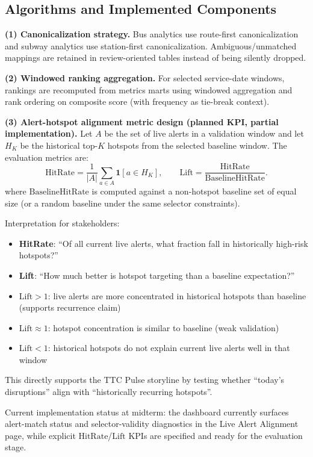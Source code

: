 \subsection{Algorithms and Implemented Components}
\textbf{(1) Canonicalization strategy.}
Bus analytics use route-first canonicalization and subway analytics use station-first canonicalization. Ambiguous/unmatched mappings are retained in review-oriented tables instead of being silently dropped.

\textbf{(2) Windowed ranking aggregation.}
For selected service-date windows, rankings are recomputed from metrics marts using windowed aggregation and rank ordering on composite score (with frequency as tie-break context).

\textbf{(3) Alert-hotspot alignment metric design (planned KPI, partial implementation).}
Let $A$ be the set of live alerts in a validation window and let $H_K$ be the historical top-$K$ hotspots from the selected baseline window. The evaluation metrics are:
\[
\mathrm{HitRate}=\frac{1}{|A|}\sum_{a \in A}\mathbf{1}[a \in H_K],
\qquad
\mathrm{Lift}=\frac{\mathrm{HitRate}}{\mathrm{BaselineHitRate}}.
\]
where \(\mathrm{BaselineHitRate}\) is computed against a non-hotspot baseline set of equal size (or a random baseline under the same selector constraints).

Interpretation for stakeholders:
\begin{itemize}
    \item \textbf{HitRate}: ``Of all current live alerts, what fraction fall in historically high-risk hotspots?''
    \item \textbf{Lift}: ``How much better is hotspot targeting than a baseline expectation?''
    \item \(\mathrm{Lift}>1\): live alerts are more concentrated in historical hotspots than baseline (supports recurrence claim)
    \item \(\mathrm{Lift}\approx 1\): hotspot concentration is similar to baseline (weak validation)
    \item \(\mathrm{Lift}<1\): historical hotspots do not explain current live alerts well in that window
\end{itemize}
This directly supports the TTC Pulse storyline by testing whether ``today's disruptions'' align with ``historically recurring hotspots''.

Current implementation status at midterm: the dashboard currently surfaces alert-match status and selector-validity diagnostics in the Live Alert Alignment page, while explicit \(\mathrm{HitRate}\)/\(\mathrm{Lift}\) KPIs are specified and ready for the evaluation stage.

